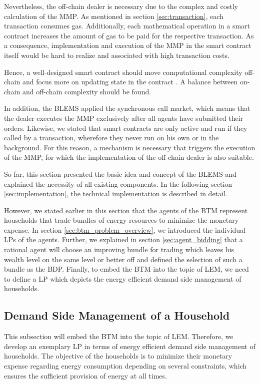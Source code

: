 Nevertheless, the off-chain dealer is necessary due to the complex and costly calculation of the MMP.
As mentioned in section \ref{sec:transaction}, each transaction consumes gas. Additionally, each mathematical operation in a smart contract
increases the amount of gas to be paid for the respective transaction. As a consequence, implementation and execution of the MMP
in the smart contract itself would be hard to realize and associated with high transaction costs. 

Hence, a well-designed smart contract should move computational complexity off-chain
and focus more on updating state in the contract . A balance between on-chain
and off-chain complexity should be found.

In addition, the BLEMS applied the synchronous call market, which means that the dealer executes the MMP exclusively after all agents 
have submitted their orders.
Likewise, we stated that smart contracts are only active and run if they called by a transaction,
wherefore they never run on his own or in the background.
For this reason, a mechanism is necessary that triggers the execution of the 
MMP, for which the implementation of the off-chain dealer is also suitable.

So far, this section presented the basic idea and concept of the BLEMS
and explained the necessity of all existing components. In the following section \ref{sec:implementation}, 
the technical implementation is described in detail. 

However, we stated earlier in this section that the agents of the BTM represent households
that trade bundles of energy resources to minimize the monetary expense. 
In section \ref{sec:btm_problem_overview}, we introduced the individual LPs of the agents.
Further, we explained in section \ref{sec:agent_bidding} that a rational agent will choose an improving bundle for 
trading which leaves his wealth level on the same level or better off and defined the selection of such a bundle 
as the BDP.
Finally, to embed the BTM into the topic of LEM, we need to define 
a LP which depicts the energy efficient demand side management of households.

\subsection{Demand Side Management of a Household}
This subsection will embed the BTM into the topic of LEM. 
Therefore, we develop an exemplary LP in terms of energy efficient demand side management of households. 
The objective of the households is to minimize their monetary expense regarding energy consumption depending
on several constraints, which ensures the sufficient provision of energy at all times.


